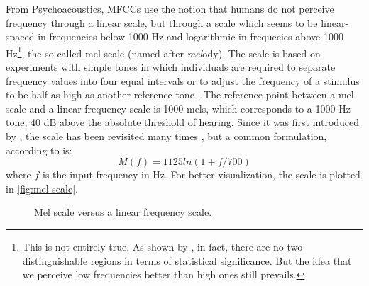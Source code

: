 From Psychoacoustics, \ac{MFCC}s use the notion that humans do not perceive frequency through a linear scale, but through a scale which seems to be linear-spaced in frequencies below 1000 Hz and logarithmic in frequecies above 1000 Hz\footnote{This is not entirely true. As shown by \citet{Umesh1999}, in fact, there are no two distinguishable regions in terms of statistical significance. But the idea that we perceive low frequencies better than high ones still prevails.}, the so-called mel scale (named after \emph{mel}ody). The scale is based on experiments with simple tones in which individuals are required to separate frequency values into four equal intervals or to adjust the frequency of a stimulus to be half as high as another reference tone \cite{Huang2001}. The reference point between a mel scale and a linear frequency scale is 1000 mels, which corresponds to a 1000 Hz tone, 40 dB above the absolute threshold of hearing. Since it was first introduced by \citet{Stevens1937}, the scale has been revisited many times \cite{Umesh1999}, but a common formulation, according to \citet{Huang2001} is:
\begin{equation}
 M(f) = 1125 ln(1 + f / 700)
\end{equation}
where $f$ is the input frequency in Hz. For better visualization, the scale is plotted in \autoref{fig:mel-scale}.

\begin{figure}[!ht]
        \noindent{}
        \caption{Mel scale versus a linear frequency scale.}\label{fig:mel-scale}
\end{figure}


